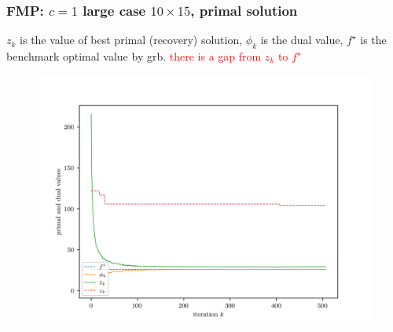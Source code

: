 \begin{frame}
  \frametitle{FMP: \(c = 1\) large case \(10\times 15\), primal solution}
  \(z_k\) is the value of best primal (recovery) solution,
  \(\phi_k\) is the dual value, \(f^\star\) is the benchmark optimal value by grb.
  \textcolor{red}{there is a gap from \(z_k\) to \(f^\star\)}
  \begin{figure}

    \includegraphics[width=.89\linewidth]{imgs/conv_0_normal_sg_10_15.png}

    \label{fig:divergent_volume}
  \end{figure}
\end{frame}

